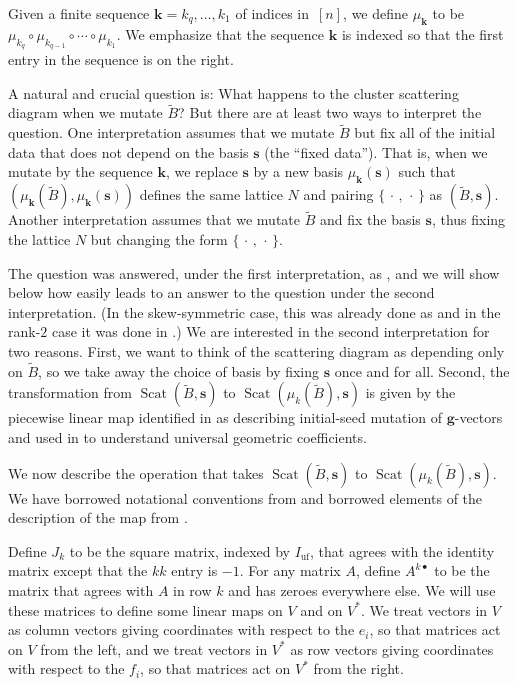 \documentclass{amsart}
\theoremstyle{definition}
\theoremstyle{remark}
\numberwithin{equation}{section}
\newcommand{\uf}{{\operatorname{uf}}}
\newcommand{\set}[1]{{\lbrace #1 \rbrace}}
\newcommand{\0}{{\mathbf{0}}}
\newcommand{\g}{\mathbf{g}}
\newcommand{\s}{\mathbf{s}}
\newcommand{\ks}{\mathbf{k}}
\newcommand{\tB}{\tilde{B}}
\newcommand{\Scat}{\operatorname{Scat}}
\begin{document}
Given a finite sequence $\ks=k_q,\ldots,k_1$ of indices in~$[n]$, we define $\mu_\ks$ to be $\mu_{k_q}\circ\mu_{k_{q-1}}\circ\cdots\circ\mu_{k_1}$.
We emphasize that the sequence $\ks$ is indexed so that the first entry in the sequence is on the right.

A natural and crucial question is:  What happens to the cluster scattering diagram when we mutate $\tB$?
But there are at least two ways to interpret the question.
One interpretation assumes that we mutate $\tB$ but fix all of the initial data that does not depend on the basis $\s$ (the ``fixed data'').
That is, when we mutate by the sequence $\ks$, we replace $\s$ by a new basis $\mu_\ks(\s)$ such that $(\mu_\ks(\tB),\mu_\ks(\s))$ defines the same lattice $N$ and pairing $\set{\,\cdot\,,\,\cdot\,}$ as $(\tB,\s)$.
Another interpretation assumes that we mutate $\tB$ and fix the basis $\s$, thus fixing the lattice $N$ but changing the form $\set{\,\cdot\,,\,\cdot\,}$.

The question was answered, under the first interpretation, as \cite[Theorem~1.24]{GHKK}, and we will show below how \cite[Theorem~1.24]{GHKK} easily leads to an answer to the question under the second interpretation.
(In the skew-symmetric case, this was already done as \cite[Lemma~5.2.1]{Muller} and in the rank-$2$ case it was done in \cite[Section~3]{CGMMRSW}.)
We are interested in the second interpretation for two reasons.
First, we want to think of the scattering diagram as depending only on $\tB$, so we take away the choice of basis by fixing $\s$ once and for all.
Second, the transformation from $\Scat(\tB,\s)$ to $\Scat(\mu_k(\tB),\s)$ is given by the piecewise linear map identified in \mbox{\cite[(7.18)]{ca4}} as describing initial-seed mutation of $\g$-vectors and used in \cite{universal} to understand universal geometric coefficients.

We now describe the operation that takes $\Scat(\tB,\s)$ to $\Scat(\mu_k(\tB),\s)$.
We have borrowed notational conventions from \cite{NZ} and borrowed elements of the description of the map from \cite[Lemma~5.2.1]{Muller}.

Define $J_k$ to be the square matrix, indexed by $I_\uf$, that agrees with the identity matrix except that the $kk$ entry is $-1$.
For any matrix $A$, define $A^{k\bullet}$ to be the matrix that agrees with $A$ in row $k$ and has zeroes everywhere else.
We will use these matrices to define some linear maps on $V$ and on $V^*$.
We treat vectors in $V$ as column vectors giving coordinates with respect to the $e_i$, so that matrices act on $V$ from the left, and we treat vectors in $V^*$ as row vectors giving coordinates with respect to the $f_i$, so that matrices act on $V^*$ from the right.
\end{document}
